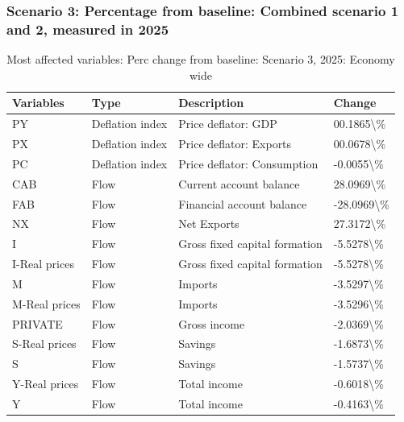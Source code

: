 \documentclass[
]{book}
\begin{document}
\hypertarget{scenario-3-percentage-from-baseline-combined-scenario-1-and-2-measured-in-2025}{%
\subsubsection{Scenario 3: Percentage from baseline: Combined scenario 1 and 2, measured in 2025}\label{scenario-3-percentage-from-baseline-combined-scenario-1-and-2-measured-in-2025}}

\begin{table}

\caption{\label{tab:most-affected-Scenario-3-perc-economy-2025}Most affected variables: Perc change from baseline: Scenario 3, 2025: Economy wide}
\centering
\fontsize{10}{12}\selectfont
\begin{tabular}[t]{l|l|l|l}
\hline
Variables & Type & Description & Change\\
\hline
PY & Deflation index & Price deflator: GDP & 00.1865\textbackslash{}\%\\
\hline
PX & Deflation index & Price deflator: Exports & 00.0678\textbackslash{}\%\\
\hline
PC & Deflation index & Price deflator: Consumption & -0.0055\textbackslash{}\%\\
\hline
CAB & Flow & Current account balance & 28.0969\textbackslash{}\%\\
\hline
FAB & Flow & Financial account balance & -28.0969\textbackslash{}\%\\
\hline
NX & Flow & Net Exports & 27.3172\textbackslash{}\%\\
\hline
I & Flow & Gross fixed capital formation & -5.5278\textbackslash{}\%\\
\hline
I-Real prices & Flow & Gross fixed capital formation & -5.5278\textbackslash{}\%\\
\hline
M & Flow & Imports & -3.5297\textbackslash{}\%\\
\hline
M-Real prices & Flow & Imports & -3.5296\textbackslash{}\%\\
\hline
PRIVATE & Flow & Gross income & -2.0369\textbackslash{}\%\\
\hline
S-Real prices & Flow & Savings & -1.6873\textbackslash{}\%\\
\hline
S & Flow & Savings & -1.5737\textbackslash{}\%\\
\hline
Y-Real prices & Flow & Total income & -0.6018\textbackslash{}\%\\
\hline
Y & Flow & Total income & -0.4163\textbackslash{}\%\\

\end{tabular}
\end{table}
\end{document}
